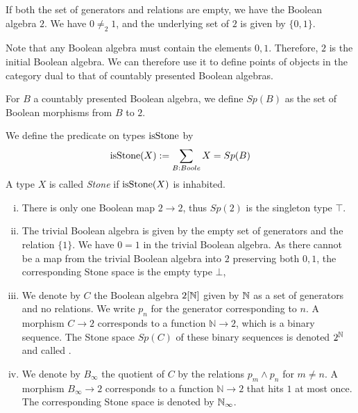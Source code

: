 \begin{example}
  If both the set of generators and relations are empty, we have the Boolean algebra $2$.
  We have $0\neq_2 1$, and the underlying set of $2$ is given by $\{0,1\}$.
\end{example}
Note that any Boolean algebra must contain the elements $0,1$. 
Therefore, $2$ is the initial Boolean algebra. 
We can therefore use it to define points of objects in the category dual to that of countably presented Boolean algebras. 

\begin{definition}
  For $B$ a countably presented Boolean algebra, we define $Sp(B)$ as the set of Boolean morphisms from $B$ to $2$. 
\end{definition}
\begin{definition}
  We define the predicate on types $\mathrm{isStone}$ by 
  \begin{equation}
    \mathrm{isStone}(X) := \sum\limits_{B : Boole} X = Sp(B)
  \end{equation} 
  A type $X$ is called \textit{Stone} if $\mathrm{isStone}(X)$ is inhabited.
\end{definition}


\begin{example}
  \label{boolean-algebra-examples}
  \begin{enumerate}[(i)]
  \item There is only one Boolean map $2\to 2$, thus $Sp(2)$ is the singleton type $\top$. 
  \item   The trivial Boolean algebra is given by the empty set of generators and the relation $\{1\}$.
    We have $0=1$ in the trivial Boolean algebra. 
    As there cannot be a map from the trivial Boolean algebra into $2$ preserving both $0,1$, 
    the corresponding Stone space is the empty type $\bot$, 
  \item\label{ExampleBAunderCantor}   
    We denote by $C$ the Boolean algebra $2[\mathbb{N}]$ given by $\mathbb{N}$ as a set of generators and no relations. We write $p_n$ for the generator corresponding to $n$.
    A morphism $C\to 2$ corresponds to a function $\mathbb N\to 2$, which is a binary sequence. 
    The Stone space $Sp(C)$ of these binary sequences is denoted $2^{\mathbb{N}}$ and called .
  \item\label{ExampleBAunderNinfty}
    We denote by $B_\infty$ the quotient of $C$ by the relations $p_m\wedge p_n$ for $m\neq n$. 
    A morphism $B_\infty\to 2$ corresponds to a function $\mathbb N \to 2$ that hits $1$ at most once. 
    The corresponding Stone space is denoted by $\mathbb{N}_\infty$. 
  \end{enumerate}
\end{example}

